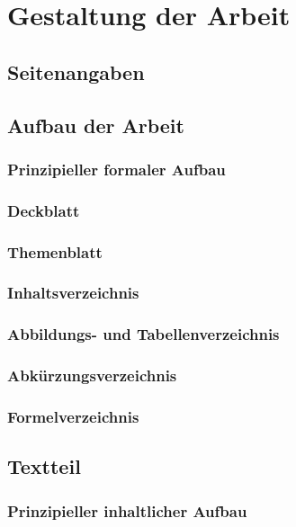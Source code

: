 \section{Gestaltung der Arbeit}
\label{formal-gestaltung}
\subsection{Seitenangaben}
\label{formal-gestaltung-seitenangaben}
\subsection{Aufbau der Arbeit}
\label{formal-gestaltung-aufbau}
\subsubsection{Prinzipieller formaler Aufbau}
\label{formal-gestaltung-aufbau-prinzipiell}
\subsubsection{Deckblatt}
\label{formal-gestaltung-aufbau-deckblatt}
\subsubsection{Themenblatt}
\label{formal-gestaltung-aufbau-themenblatt}
\subsubsection{Inhaltsverzeichnis}
\label{formal-gestaltung-aufbau-inhaltsverzeichnis}
\subsubsection{Abbildungs- und Tabellenverzeichnis}
\label{formal-gestaltung-aufbau-abbild-tab-verz}
\subsubsection{Abkürzungsverzeichnis}
\label{formal-gestaltung-aufbau-acro-verz}
\subsubsection{Formelverzeichnis}
\label{formal-gestaltung-aufbau-formel-verz}
\subsection{Textteil}
\label{formal-gestaltung-textteil}
\subsubsection{Prinzipieller inhaltlicher Aufbau}
\label{formal-gestaltung-textteil-prinzipiell}
